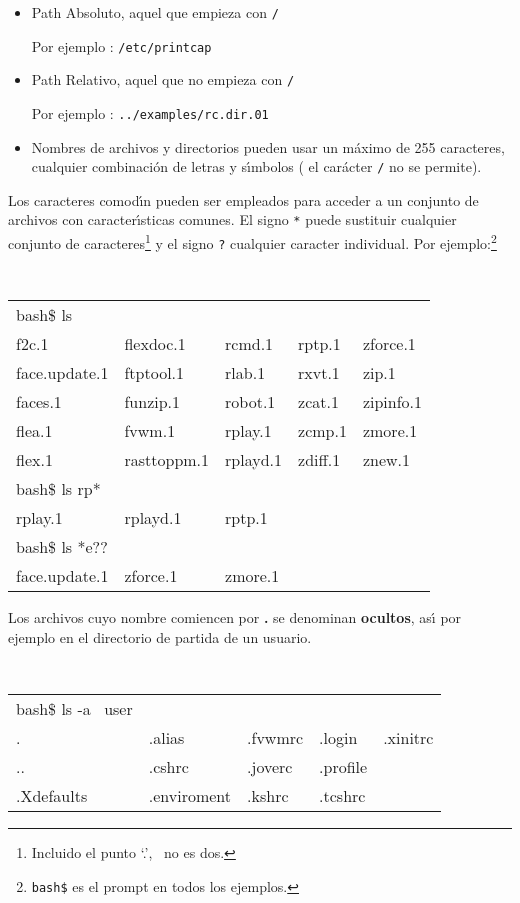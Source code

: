 \begin{itemize}

\item Path Absoluto, aquel que empieza con \verb+/+

Por ejemplo : \verb+/etc/printcap+

\item Path Relativo, aquel que {\sc no} empieza con \verb+/+

Por ejemplo : \verb+../examples/rc.dir.01+

\item Nombres de archivos y directorios pueden usar un m{\'a}ximo de 255
  caracteres, cualquier combinaci{\'o}n de letras y s{\'\i}mbolos ( el car{\'a}cter
  \verb+/+ no se permite).

\end{itemize}

  Los caracteres comod{\'\i}n pueden ser empleados para acceder a un
  conjunto de archivos con caracter{\'\i}sticas comunes. El signo \verb+*+ puede
  sustituir cualquier conjunto de caracteres\footnote{Incluido el
    punto `.', \unix\ no es {\sc dos}.} y el signo \verb+?+ cualquier caracter
  individual. Por ejemplo:\footnote{{\tt bash\$} es el prompt en todos los
    ejemplos.}

{\tt
\begin{tabular}{lllll}
bash\$ ls& & & &\\
f2c.1 &flexdoc.1 &rcmd.1 &rptp.1 &zforce.1 \\
face.update.1 &ftptool.1 &rlab.1 &rxvt.1 &zip.1 \\
faces.1 &funzip.1 &robot.1 &zcat.1 &zipinfo.1 \\
flea.1 &fvwm.1 &rplay.1 &zcmp.1 &zmore.1 \\
flex.1 &rasttoppm.1 &rplayd.1 &zdiff.1 &znew.1\\
bash\$ ls rp* & & & &\\
rplay.1 &rplayd.1 &rptp.1 & & \\
bash\$ ls *e?? & & & & \\
 face.update.1 &zforce.1 &zmore.1 & &\\
\end{tabular} 
}

\noindent
Los archivos cuyo nombre comiencen por {\bf .} se denominan {\bf
  ocultos}, as{\'\i} por ejemplo en el directorio de partida de un usuario.

{\tt
\begin{tabular}{lllll}
bash\$ ls -a ~user & & & & \\
 . &.alias &.fvwmrc &.login &.xinitrc \\
.. &.cshrc &.joverc &.profile & \\
.Xdefaults &.enviroment &.kshrc &.tcshrc &\\
\end{tabular}
}

